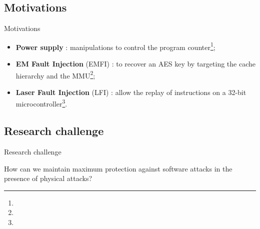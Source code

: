 \subsection{Motivations}
\begin{frame}{Motivations}
    \begin{block}{}
        \begin{itemize}
            \item \textbf{Power supply} : manipulations to control the program counter\footnote[frame]{\tiny{}};
            \item \textbf{EM Fault Injection} (EMFI) : to recover an AES key by targeting the cache hierarchy and the MMU\footnote[frame]{\tiny{}};
            \item \textbf{Laser Fault Injection} (LFI) : allow the replay of instructions on a 32-bit microcontroller\footnote[frame]{\tiny{}}.
        \end{itemize}
    \end{block}

\end{frame}
\subsection{Research challenge}
\begin{frame}{Research challenge}
    \begin{exampleblock}{}
        \centering
        \Large How can we maintain maximum protection against software attacks in the presence of physical attacks?
    \end{exampleblock}
\end{frame}
